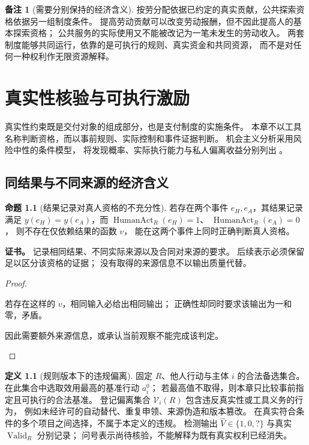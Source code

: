 \documentclass[UTF8,12pt,a4paper,openany,fontset=none,zihao=false]{ctexrep}
\theoremstyle{definition}
\newtheorem{definition}{定义}[chapter]
\newtheorem{proposition}{命题}[chapter]
\newtheorem{remark}{备注}[chapter]
\newenvironment{certificate}{\par\noindent\textbf{证书。}\ignorespaces}{\par}
\newcommand{\1}{\mathbf 1}
\begin{document}
\begin{remark}[需要分别保持的经济含义]
按劳分配依据已约定的真实贡献，公共探索资格依据另一组制度条件。
提高劳动贡献可以改变劳动报酬，但不因此提高人的基本探索资格；
公共服务的实际使用又不能被改记为一笔未发生的劳动收入。
两套制度能够共同运行，依靠的是可执行的规则、真实资金和共同资源，
而不是对任何一种权利作无限资源解释。
\end{remark}

\chapter{真实性核验与可执行激励}
\label{inc:chapter}

真实性约束既是交付对象的组成部分，也是支付制度的实施条件。
本章不以工具名称判断资格，而以事前规则、实际控制和事件证据判断。
机会主义分析采用风险中性的条件模型，
将发现概率、实际执行能力与私人偏离收益分别列出
\cite{InternalEconomics,Becker1968}。

\section{同结果与不同来源的经济含义}

\begin{proposition}[结果记录对真人资格的不充分性]
\label{inc:prop-origin}
若存在两个事件 \(e_H,e_A\)，其结果记录满足
\(y(e_H)=y(e_A)\)，而
\(\operatorname{HumanAct}_R(e_H)=1\)、
\(\operatorname{HumanAct}_R(e_A)=0\)，
则不存在仅依赖结果的函数 \(v\)，
能在这两个事件上同时正确判断真人资格。
\end{proposition}
\begin{certificate}
记录相同结果、不同实际来源以及合同对来源的要求。
后续表示必须保留足以区分该资格的证据；
没有取得的来源信息不以输出质量代替。
\end{certificate}
\begin{proof}
\begin{semanticsteps}
\item 若存在这样的 \(v\)，相同输入必给出相同输出；
正确性却同时要求该输出为一和零，矛盾。
\item 因此需要额外来源信息，或承认当前观察不能完成该判定。
\end{semanticsteps}
\end{proof}

\begin{definition}[规则版本下的违规偏离]
\label{inc:def-deviation}
固定 \(R\)、他人行动与主体 \(i\) 的合法备选集合。
在此集合中选取效用最高的基准行动 \(a_i^0\)；
若最高值不取得，则本章只比较事前指定且可执行的合法基准。
登记偏离集合 \(\mathcal V_i(R)\) 包含违反真实性或工具义务的行为，
例如未经许可的自动替代、重复申领、来源伪造和版本篡改。
在真实符合条件的多个项目之间选择，不属于本定义的违规。
检测输出 \(\widehat V\in\{1,0,?\}\)
与真实 \(\operatorname{Valid}_R\) 分别记录；
问号表示尚待核验，不能解释为既有真实权利已经消失。
\end{definition}
\end{document}
